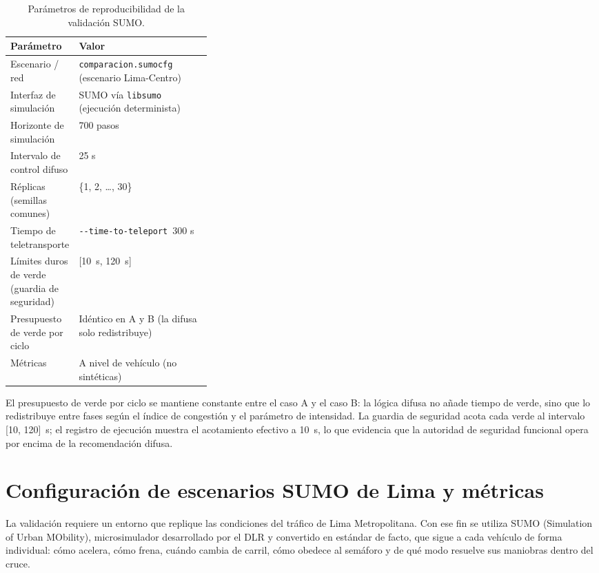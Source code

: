 \begin{table}[H]
  \centering
  \footnotesize
  \caption{Parámetros de reproducibilidad de la validación SUMO.}
  \label{tab:reproducibilidad}
  \begin{tabularx}{\linewidth}{@{}p{0.34\linewidth}X@{}}
    \toprule
    \textbf{Parámetro} & \textbf{Valor}\\
    \midrule
    Escenario / red & \texttt{comparacion.sumocfg} (escenario Lima-Centro)\\
    Interfaz de simulación & SUMO vía \texttt{libsumo} (ejecución determinista)\\
    Horizonte de simulación & 700 pasos\\
    Intervalo de control difuso & 25 s\\
    Réplicas (semillas comunes) & \{1, 2, \ldots, 30\}\\
    Tiempo de teletransporte & \texttt{-{}-time-to-teleport}~300 s\\
    Límites duros de verde (guardia de seguridad) & [10~s, 120~s]\\
    Presupuesto de verde por ciclo & Idéntico en A y B (la difusa solo redistribuye)\\
    Métricas & A nivel de vehículo (no sintéticas)\\
    \bottomrule
  \end{tabularx}
\end{table}

El presupuesto de verde por ciclo se mantiene constante entre el caso A y el caso B: la
lógica difusa no añade tiempo de verde, sino que lo redistribuye entre fases según el índice
de congestión y el parámetro de intensidad. La guardia de seguridad acota cada verde al
intervalo [10, 120]~s; el registro de ejecución muestra el acotamiento efectivo a 10~s,
lo que evidencia que la autoridad de seguridad funcional opera por encima de la recomendación
difusa.

\section{Configuración de escenarios SUMO de Lima y métricas}\label{sec:escenarios-metricas}

La validación requiere un entorno que replique las condiciones del tráfico de Lima
Metropolitana. Con ese fin se utiliza SUMO (Simulation of Urban MObility),
microsimulador desarrollado por el DLR y convertido en estándar de facto, que sigue a cada vehículo de forma
individual: cómo acelera, cómo frena, cuándo cambia de carril, cómo obedece al semáforo y de qué modo
resuelve sus maniobras dentro del cruce.


